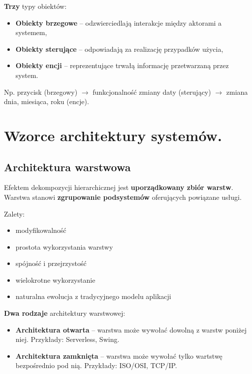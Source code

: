 \documentclass[main.tex]{subfiles}
\begin{document}
    \textbf{Trzy} typy obiektów:
    \begin{itemize}
        \item \textbf{Obiekty brzegowe} -- odzwierciedlają interakcje między aktorami a systemem,
        \item \textbf{Obiekty sterujące} -- odpowiadają za realizację przypadków użycia,
        \item \textbf{Obiekty encji} -- reprezentujące trwałą informację przetwarzaną przez system.
    \end{itemize}
    Np. przycisk (brzegowy) $\rightarrow$ funkcjonalność zmiany daty (sterujący)  $\rightarrow$ zmiana dnia, miesiąca,
    roku (encje).


    \section{Wzorce architektury systemów.}

    \subsection{Architektura warstwowa}

    Efektem dekompozycji hierarchicznej jest \textbf{uporządkowany zbiór warstw}. Warstwa stanowi
    \textbf{zgrupowanie podsystemów} oferujących powiązane usługi.

    \noindent Zalety:
    \begin{itemize}[noitemsep]
        \item modyfikowalność
        \item prostota wykorzystania warstwy
        \item spójność i przejrzystość
        \item wielokrotne wykorzystanie
        \item naturalna ewolucja z tradycyjnego modelu aplikacji
    \end{itemize}

    \noindent \textbf{Dwa rodzaje} architektury warstwowej:
    \begin{itemize}
        \item \textbf{Architektura otwarta} -- warstwa może wywołać dowolną z warstw poniżej niej.
        Przykłady: Serverless, Swing.

        \item \textbf{Architektura zamknięta} -- warstwa może wywołać tylko wartstwę bezpośrednio pod nią.
        Przykłady: ISO/OSI, TCP/IP.
    \end{itemize}
\end{document}

